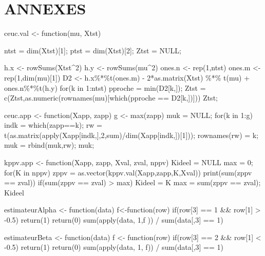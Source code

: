 \documentclass[a4paper,11pt]{article}
\begin{document}
\section*{ANNEXES}
      \begin{code}
      ceuc.val <- function(mu, Xtst){
	      ntst = dim(Xtst)[1];
	      ptst = dim(Xtst)[2];
	      Ztst = NULL;
	
	      h.x <- rowSums(Xtst^2)
	      h.y <- rowSums(mu^2)
	      ones.n <- rep(1,ntst)
	      ones.m <- rep(1,dim(mu)[1])
	      D2 <- h.x\%*\%t(ones.m) - 2*as.matrix(Xtst) \%*\% t(mu) + ones.n\%*\%t(h.y)
	      for(k in 1:ntst){
		      pproche = min(D2[k,]);
		      Ztst = c(Ztst,as.numeric(rownames(mu)[which(pproche == D2[k,])]))
	      }
	      Ztst;
      }
      \end{code}
      
      \begin{code}
      ceuc.app <- function(Xapp, zapp){
	      g <- max(zapp)
	      muk = NULL;
	      for(k in 1:g){
		      indk = which(zapp==k);
		      rw = t(as.matrix(apply(Xapp[indk,],2,sum)/dim(Xapp[indk,])[1]));
		      rownames(rw) = k;
		      muk = rbind(muk,rw);
	      }
	      muk;
      }
      \end{code}
      

      \begin{code}
      kppv.app <- function(Xapp, zapp, Xval, zval, nppv)
      {
        Kideel = NULL
        max = 0;
        for(K in nppv){
          zppv = as.vector(kppv.val(Xapp,zapp,K,Xval))
          print(sum(zppv == zval))
          if(sum(zppv == zval) > max){
            Kideel = K
            max = sum(zppv == zval);
          }
        }
        Kideel
      }
      \end{code}
      
      \begin{code}
      estimateurAlpha <- function(data){
        f<-function(row) {
          if(row[3] == 1 && row[1] > -0.5){ 
            return(1) 
          } 
          return(0) 
        }
        sum(apply(data, 1,f )) / sum(data[,3] == 1)
      }
      
      estimateurBeta <- function(data){
        f <- function(row) {
          if(row[3] == 2 && row[1] < -0.5){ 
            return(1) 
          } 
          return(0) 
        }
        sum(apply(data, 1, f)) / sum(data[,3] == 1)
      }
      \end{code}
\end{document}
